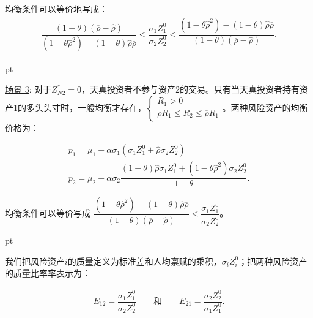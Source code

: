 \documentclass[10.0pt]{article}
\begin{document}
均衡条件可以等价地写成：
\begin{eqnarray*}
\dfrac{(1 - \theta) (\overline{\rho} - {\hat \rho})}{(1 - \theta {\hat \rho}^2) - (1 - \theta) {\hat \rho} \overline{\rho}} < \dfrac{\sigma_1 Z_1^0}{\sigma_2 Z_2^0} < \dfrac{(1 - \theta {\hat \rho}^2) - (1 - \theta) {\hat \rho} \overline{\rho}}{(1 - \theta) (\overline{\rho} - {\hat \rho})}.
\end{eqnarray*}

 pt



\underline{场景 3}: 对于$ Z_{N 2}^* = 0$，天真投资者不参与资产2的交易。只有当天真投资者持有资产1的多头头寸时，一般均衡才存在，$ \left\{ \begin{matrix} R_1 > 0 \\ \underline{\rho} R_1 \leqslant R_2 \leqslant \overline{\rho} R_1 \end{matrix} \right. $。两种风险资产的均衡价格为：

\begin{eqnarray}
& p_1 = \mu_1 - \alpha \sigma_1 (\sigma_1 Z_1^0 + {\hat \rho} \sigma_2 Z_2^0) & \\
& p_2 = \mu_2 - \alpha \sigma_2 \dfrac{(1 - \theta) {\hat \rho} \sigma_1 Z_1^0 + (1 - \theta {\hat \rho}^2) \sigma_2 Z_2^0}{1 - \theta}. &
\end{eqnarray}

均衡条件可以等价写成 $ \dfrac{(1 - \theta {\hat \rho}^2) - (1 - \theta) {\hat \rho} \overline{\rho}}{(1 - \theta) (\overline{\rho} - {\hat \rho})} \leqslant \dfrac{\sigma_1 Z_1^0}{\sigma_2 Z_2^0} $。

 pt


我们把风险资产$i$的质量定义为标准差和人均禀赋的乘积，$ \sigma_i Z_i^0 $；把两种风险资产的质量比率率表示为：

\begin{eqnarray*}
E_{1 2} = \dfrac{\sigma_1 Z_1^0}{\sigma_2 Z_2^0} \qquad \text{和} \qquad E_{2 1} = \dfrac{\sigma_2 Z_2^0}{\sigma_1 Z_1^0}.
\end{eqnarray*}
\end{document}
